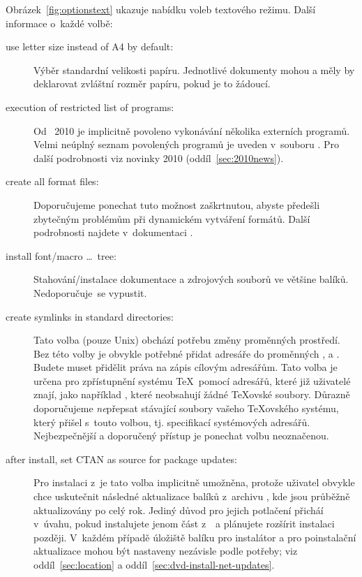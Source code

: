 \documentclass[\classoptions,slovak,english,czech]{\classname}
\begin{document}
Obrázek~\ref{fig:optionstext} ukazuje nabídku voleb textového režimu.
Další informace o~každé volbě:

\begin{description}
\item[use letter size instead of A4 by default:] Výběr standardní velikosti papíru.  
Jednotlivé dokumenty mohou a měly by deklarovat zvláštní 
rozměr papíru, pokud je to žádoucí.

\item[execution of restricted list of programs:] 
Od \TL\ 2010 je implicitně povoleno vykonávání
několika externích programů. Velmi neúplný seznam 
povolených programů je uveden v~souboru .
Pro další podrobnosti viz novinky 2010 (oddíl~\ref{sec:2010news}).

\item[create all format files:] Doporučujeme ponechat tuto možnost
zaškrtnutou, abyste předešli zbytečným problémům při dynamickém vytváření formátů. 
Další podrobnosti najdete v~dokumentaci . 

\item[install font/macro \ldots\ tree:] Stahování/instalace 
dokumentace a zdrojových souborů ve většine balíků.
Nedoporučuje~se vypustit.

\item[create symlinks in standard directories:] 
Tato volba (pouze Unix) obchází potřebu změny proměnných prostředí. Bez této 
volby je obvykle potřebné přidat adresáře \TL{} do proměnných
,  a . 
Budete muset přidělit práva na zápis cílovým adresářům. Tato volba je 
určena pro zpřístupnění systému \TeX\ pomocí adresářů, 
které již uživatelé znají, jako například , 
které neobsahují žádné \TeX ovské soubory. Důrazně doporučujeme \emph{ne}přepsat 
stávající soubory vašeho \TeX ovského systému, 
který přišel s~touto volbou, tj. specifikací systémových adresářů.
Nejbezpečnější a doporučený přístup je ponechat volbu neoznačenou.

\item[after install, set CTAN as source for package updates:]
Pro instalaci z~\DVD je
tato volba implicitně umožněna, protože uživatel obvykle chce uskutečnit
následné aktualizace balíků z~archivu \CTAN, kde jsou průběžně 
aktualizovány po celý rok. Jediný důvod pro jejich potlačení 
přicháí v~úvahu, pokud instalujete jenom část z~\DVD\ a plánujete
rozšírit instalaci později. V~každém případě úložiště balíku pro
instalátor a pro poinstalační aktualizace mohou být nastaveny nezávisle
podle potřeby; viz oddíl~\ref{sec:location}
 a oddíl~\ref{sec:dvd-install-net-updates}.
\end{description}
\end{document}
